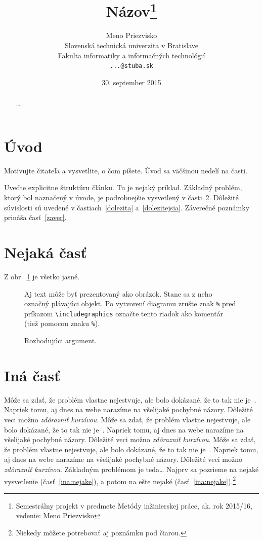 \documentclass[10pt,twoside,slovak,a4paper]{article}
\title{Názov\thanks{Semestrálny projekt v predmete Metódy inžinierskej práce, ak. rok 2015/16, vedenie: Meno Priezvisko}} %
\author{Meno Priezvisko\\[2pt]
	{\small Slovenská technická univerzita v Bratislave}\\
	{\small Fakulta informatiky a informačných technológií}\\
	{\small \texttt{...@stuba.sk}}
	}
\date{\small 30. september 2015} %
\begin{document}
\maketitle

\begin{abstract}
\ldots
\end{abstract}



\section{Úvod}

Motivujte čitateľa a vysvetlite, o čom píšete. Úvod sa väčšinou nedelí na časti.

Uveďte explicitne štruktúru článku. Tu je nejaký príklad.
Základný problém, ktorý bol naznačený v úvode, je podrobnejšie vysvetlený v časti~\ref{nejaka}.
Dôležité súvislosti sú uvedené v častiach~\ref{dolezita} a~\ref{dolezitejsia}.
Záverečné poznámky prináša časť~\ref{zaver}.



\section{Nejaká časť} \label{nejaka}

Z obr.~\ref{f:rozhod} je všetko jasné. 

\begin{figure}[tbh]
\centering
Aj text môže byť prezentovaný ako obrázok. Stane sa z neho označný plávajúci objekt. Po vytvorení diagramu zrušte znak \texttt{\%} pred príkazom \verb|\includegraphics| označte tento riadok ako komentár (tiež pomocou znaku \texttt{\%}).
\caption{Rozhodujúci argument.}
\label{f:rozhod}
\end{figure}



\section{Iná časť} \label{ina}
Môže sa zdať, že problém vlastne nejestvuje\cite{Coplien:MPD}, ale bolo dokázané, že to tak nie je~\cite{Czarnecki:Staged, Czarnecki:Progress}. Napriek tomu, aj dnes na webe narazíme na všelijaké pochybné názory\cite{PLP-Framework}. Dôležité veci možno \emph{zdôrazniť kurzívou}.
Môže sa zdať, že problém vlastne nejestvuje\cite{Coplien:MPD}, ale bolo dokázané, že to tak nie je~\cite{Czarnecki:Staged, Czarnecki:Progress}. Napriek tomu, aj dnes na webe narazíme na všelijaké pochybné názory\cite{PLP-Framework}. Dôležité veci možno \emph{zdôrazniť kurzívou}.
Môže sa zdať, že problém vlastne nejestvuje\cite{Coplien:MPD}, ale bolo dokázané, že to tak nie je~\cite{Czarnecki:Staged, Czarnecki:Progress}. Napriek tomu, aj dnes na webe narazíme na všelijaké pochybné názory\cite{PLP-Framework}. Dôležité veci možno \emph{zdôrazniť kurzívou}.
Základným problémom je teda\ldots{} Najprv sa pozrieme na nejaké vysvetlenie (časť~\ref{ina:nejake}), a potom na ešte nejaké (časť~\ref{ina:nejake}).\footnote{Niekedy môžete potrebovať aj poznámku pod čiarou.}
\end{document}
